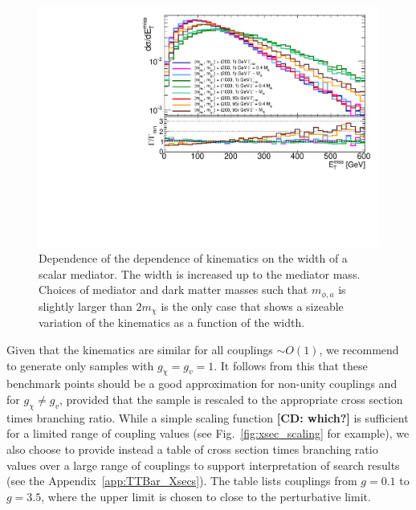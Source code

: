 \begin{figure}[!ht]
  \begin{center}
    \includegraphics[scale=0.45]{figures/ttbar/ScalarWidth.pdf}
    \vspace{2mm}
    \caption{\label{fig:widthlargescan} Dependence of the dependence of kinematics on the width of a scalar mediator. The width is increased up to the mediator mass. Choices of mediator and dark matter masses such that $m_{\phi,a}$ is slightly larger than $2m_\chi$ is the only case that shows a sizeable variation of the kinematics as a function of the width.  
    }
\end{center}
\end{figure}

Given that the kinematics are similar for all couplings $\sim O(1)$, we recommend to generate only samples with $g_{\chi} = g_{v} = 1$. It follows from this that these benchmark points should be a good approximation for non-unity couplings and for $g_{\chi} \neq g_{v}$, provided that the sample is rescaled to the appropriate cross section times branching ratio. While a simple scaling function \textbf{[CD: which?]} is sufficient for a limited range of coupling values (see Fig.~\ref{fig:xsec_scaling} for example), we also choose to provide instead a table of cross section times branching ratio values over a large range of couplings to support interpretation of search results (see the Appendix~\ref{app:TTBar_Xsecs}). The table lists couplings from $g=0.1$ to $g=3.5$, where the upper limit is chosen to close to the perturbative limit.

